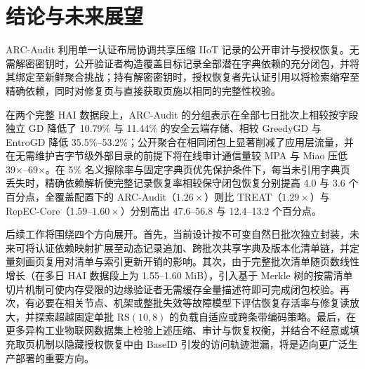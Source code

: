 \documentclass[10pt,journal]{IEEEtran}
\begin{document}
\section{结论与未来展望}
ARC-Audit 利用单一认证布局协调共享压缩 IIoT 记录的公开审计与授权恢复。无需解密密钥时，公开验证者构造覆盖目标记录全部潜在字典依赖的充分闭包，并将其绑定至新鲜聚合挑战；持有解密密钥时，授权恢复者先认证引用以将检索缩窄至精确依赖，同时对修复页与直接获取页施以相同的完整性校验。

在两个完整 HAI 数据段上，ARC-Audit 的分组表示在全部七日批次上相较按字段独立 GD 降低了 10.79\% 与 11.44\% 的安全云端存储、相较 GreedyGD 与 EntroGD 降低 35.5\%--53.2\%；公开聚合在相同闭包上显著削减了应用层流量，并在无需维护吉字节级外部目录的前提下将在线审计通信量较 MPA 与 Miao 压低 39$\times$--69$\times$。在 5\% 名义擦除率与固定字典页优先保护条件下，每当未引用字典页丢失时，精确依赖解析使完整记录恢复率相较保守闭包恢复分别提高 4.0 与 3.6 个百分点，全覆盖配置下的 ARC-Audit（$1.26\times$）则比 TREAT（$1.29\times$）与 RepEC-Core（$1.59$--$1.60\times$）分别高出 47.6--56.8 与 12.4--13.2 个百分点。

后续工作将围绕四个方向展开。首先，当前设计按不可变自然日批次独立封装，未来可将认证依赖映射扩展至动态记录追加、跨批次共享字典及版本化清单链，并定量刻画页复用对清单与索引更新开销的影响。其次，由于完整批次清单随页数线性增长（在多日 HAI 数据段上为 1.55--1.60 MiB），引入基于 Merkle 树的按需清单切片机制可使内存受限的边缘验证者无需缓存全量描述符即可完成闭包校验。再次，有必要在相关节点、机架或整批失效等故障模型下评估恢复存活率与修复读放大，并探索超越固定单批 RS$(10,8)$ 的负载自适应或跨条带编码策略。最后，在更多异构工业物联网数据集上检验上述压缩、审计与恢复权衡，并结合不经意或填充取页机制以隐藏授权恢复中由 BaseID 引发的访问轨迹泄漏，将是迈向更广泛生产部署的重要方向。



\end{document}
